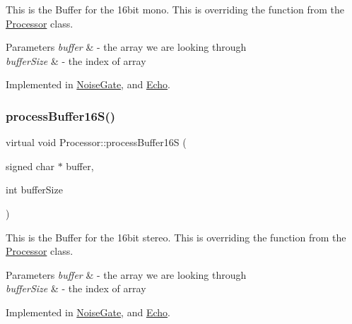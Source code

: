 This is the Buffer for the 16bit mono. This is overriding the function from the \hyperlink{classProcessor}{Processor} class. 
\begin{DoxyParams}{Parameters}
{\em buffer} & -\/ the array we are looking through \\
\hline
{\em buffer\+Size} & -\/ the index of array \\
\hline
\end{DoxyParams}


Implemented in \hyperlink{classNoiseGate_a56265390315ad1c22571742d50453f36}{Noise\+Gate}, and \hyperlink{classEcho_a060205b12368c89d44429f86c67d9e94}{Echo}.

\mbox{\label{classProcessor_a8e00c52bcb0f38c3707f55fe69351e12}} 
\subsubsection{\texorpdfstring{process\+Buffer16\+S()}{processBuffer16S()}}
{\footnotesize\ttfamily virtual void Processor\+::process\+Buffer16S (\begin{DoxyParamCaption}\item[{signed char $\ast$}]{buffer,  }\item[{int}]{buffer\+Size }\end{DoxyParamCaption})\hspace{0.3cm}{\ttfamily [pure virtual]}}

This is the Buffer for the 16bit stereo. This is overriding the function from the \hyperlink{classProcessor}{Processor} class. 
\begin{DoxyParams}{Parameters}
{\em buffer} & -\/ the array we are looking through \\
\hline
{\em buffer\+Size} & -\/ the index of array \\
\hline
\end{DoxyParams}


Implemented in \hyperlink{classNoiseGate_ad4da7fd52a07d637e24e69475d1ed89f}{Noise\+Gate}, and \hyperlink{classEcho_ae2bc9996a4c797170be9e8d0f9132bdf}{Echo}.

\mbox{\label{classProcessor_aa28dc423c5ee21b11d907a7c13ad81c8}} 
